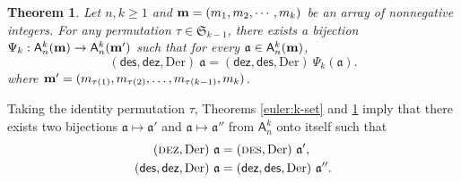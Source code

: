 \documentclass[12pt]{amsart} %
\numberwithin{equation}{section}
\theoremstyle{plain}
\newtheorem{theorem}{Theorem}[section]
\theoremstyle{definition}
\newcommand\A{\mathsf{A}}
\def\dez{\mathsf{dez}}
\def\Der{\mathrm{Der}}
\def\DES{\hbox{\rm\textsc{des}}}
\def\DEZ{\hbox{\rm\textsc{dez}}}
\def\des{\mathsf{des}}
\def\S{\mathfrak{S}}
\def\a{\mathfrak{a}}
\begin{document}
%
\begin{theorem}\label{double-euler}
Let $n,k\geq1$ and 
${\bf m}=(m_1, m_2, \cdots, m_k)$ be an array of nonnegative integers.
	For any permutation $\tau\in \S_{k-1}$,
	there exists a bijection $\Psi_k: \A_n^k({\bf m}) \rightarrow \A_n^k({\bf m'})$ such that for every $\a\in\A_n^k(\bf m)$,
\begin{equation}\label{eq:double-euler}
(\des, \dez, \Der)~\a = (\dez, \des, \Der)~\Psi_k(\a).
\end{equation}
	where ${\bf m'} = (m_{\tau(1)}, m_{\tau(2)}, \ldots, m_{\tau(k-1)}, m_k)$.
\end{theorem}

Taking the identity permutation $\tau$, Theorems \ref{euler:k-set} and \ref{double-euler} imply that there exists two bijections $\a \mapsto \a'$ and $\a\mapsto \a''$  from $\A_n^k$ onto itself such that
\begin{align*}
	(\DEZ,  \Der)~\a &= (\DES,  \Der)~\a',\\
	(\des, \dez, \Der)~\a &= (\dez, \des, \Der)~\a''.
\end{align*}

\medskip
\end{document}
